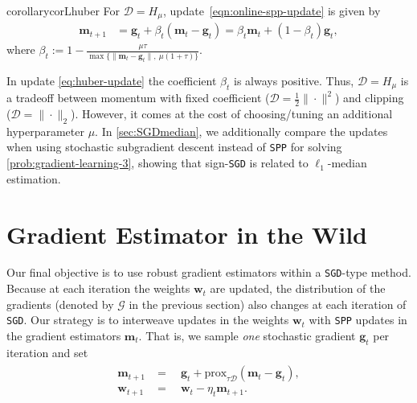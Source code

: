 \documentclass[10pt]{article} %
\renewcommand{\vec}[1]{\bm{#1}}
\newcommand{\bw}{\bm{w}}
\newcommand{\bg}{\bm{g}}
\newcommand{\prox}[1]{\mathrm{prox}_{#1}}
\newcommand{\dist}{\mathcal{D}}
\newcommand{\SGD}{\texttt{SGD}}
\newcommand{\SPP}{\texttt{SPP}}
\begin{document}
\begin{restatable}{corollary}{corLhuber}\label{cor:huber}
For $\dist = H_{\mu}$, update~\eqref{eqn:online-spp-update} is given by
\begin{align} \label{eq:huber-update}
    \vec{m}_{t+1} &= \vec{g}_t + \beta_t (\vec{m}_t -\vec{g}_t) 
    =    \beta_t \vec{m}_t 
    + (1-\beta_t) \vec{g}_t,
\end{align}
where $\beta_t := 1-\tfrac{\mu\tau}{\max\{\|\vec{m}_t- \vec{g}_t\|,~ \mu(1+\tau)\}}$.
\end{restatable}



In update \eqref{eq:huber-update} the coefficient $\beta_t$ is always positive. Thus, $\dist = H_{\mu}$ is a tradeoff between momentum with fixed coefficient ($\dist=\frac12\|\cdot\|^2$) and clipping ($\dist = \|\cdot\|_2$). However, it comes at the cost of choosing/tuning an additional hyperparameter $\mu$. In \cref{sec:SGDmedian}, we additionally compare the updates when using stochastic subgradient descent instead of \SPP{} for solving \eqref{prob:gradient-learning-3}, showing that sign-\SGD{} is related to $\ell_1$-median estimation.

\section{Gradient Estimator in the Wild}\label{sec:grad-est-in-the-wild}

Our final objective is to use robust gradient estimators within a \SGD-type method. Because at each iteration the weights $\bw_t$ are updated, the distribution of the gradients (denoted by $\mathcal{G}$ in the previous section) also changes at each iteration of \SGD{}. 
Our strategy is  to interweave updates in the weights $\bw_t$ with \SPP{} updates in the gradient estimators $\vec{m}_t.$ 
That is, we sample \emph{one} stochastic gradient $\bg_t$ per iteration  and set
\begin{align} \label{eq:online-update}
\begin{array}{llr}    
    \vec{m}_{t+1} &=\quad 
    \vec{g}_t + \prox{\tau\dist}(\vec{m}_t-\vec{g}_t), \\%
    \vec{w}_{t+1} &= \quad\vec{w}_t - \eta_t \vec{m}_{t+1}. \\%
    \end{array}
\end{align} 
\end{document}
